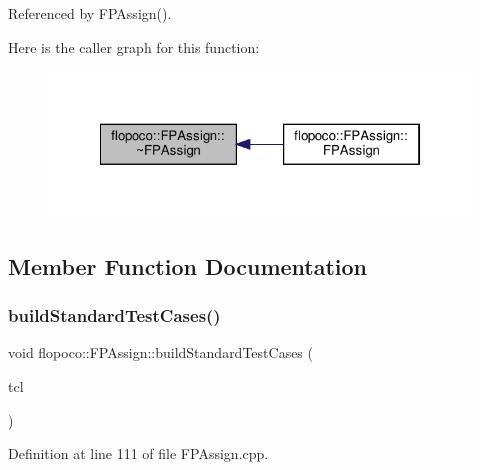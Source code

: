 Referenced by F\+P\+Assign().

Here is the caller graph for this function\+:
\nopagebreak
\begin{figure}[H]
\begin{center}
\leavevmode
\includegraphics[width=322pt]{d6/d17/classflopoco_1_1FPAssign_a29a88061e13eeabef4a84a496ced7f95_icgraph}
\end{center}
\end{figure}


\subsection{Member Function Documentation}
\mbox{\label{classflopoco_1_1FPAssign_a0cfb17eec1c3c5f27009a0fb5a8e34b7}} 
\subsubsection{\texorpdfstring{build\+Standard\+Test\+Cases()}{buildStandardTestCases()}}
{\footnotesize\ttfamily void flopoco\+::\+F\+P\+Assign\+::build\+Standard\+Test\+Cases (\begin{DoxyParamCaption}\item[{Test\+Case\+List $\ast$}]{tcl }\end{DoxyParamCaption})\hspace{0.3cm}{\ttfamily [override]}}



Definition at line 111 of file F\+P\+Assign.\+cpp.

\mbox{\label{classflopoco_1_1FPAssign_a9e0bbf237f25b43ec8c3b64e3e04dbc5}} 
